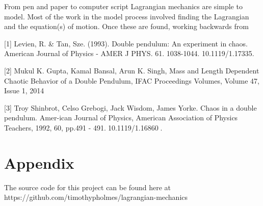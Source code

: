 \documentclass[runningheads]{llncs}
\begin{document}
From pen and paper to computer script Lagrangian mechanics are simple to model. Most of the work in the model process involved finding the Lagrangian and the equation(s) of motion. Once these are found, working backwards from

\clearpage{}



\clearpage{}
%
%
%





[1] Levien, R. & Tan, Sze. (1993). Double pendulum: An experiment in chaos. American Journal of Physics - AMER J PHYS. 61. 1038-1044. 10.1119/1.17335. 

[2] Mukul K. Gupta, Kamal Bansal, Arun K. Singh,
Mass and Length Dependent Chaotic Behavior of a Double Pendulum,
IFAC Proceedings Volumes, Volume 47, Issue 1, 2014

[3] Troy Shinbrot, Celso Grebogi, Jack Wisdom, James Yorke.  Chaos in a double pendulum.  Amer-ican  Journal  of  Physics,  American  Association  of  Physics  Teachers,  1992,  60,  pp.491  -  491.￿10.1119/1.16860￿.




\section*{Appendix}

The source code for this project can be found here at \\
https://github.com/timothypholmes/lagrangian-mechanics
\end{document}
